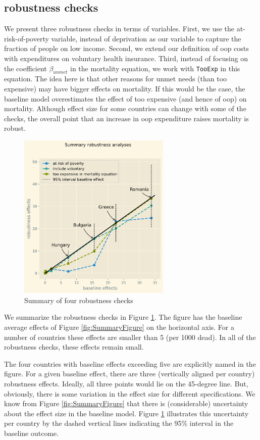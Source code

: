 \documentclass[a4paper,12pt]{article}
\begin{document}
\subsection{robustness checks}
\label{sec:orgbb2c578}

We present three robustness checks in terms of variables. First, we use the at-risk-of-poverty variable, instead of deprivation as our variable to capture the fraction of people on low income. Second, we extend our definition of oop costs with expenditures on voluntary health insurance. Third, instead of focusing on the coefficient \(\beta_{unmet}\) in the mortality equation, we work with \texttt{TooExp} in this equation. The idea here is that other reasons for unmet needs (than too expensive) may have bigger effects on mortality. If this would be the case, the baseline model overestimates the effect of too expensive (and hence of oop) on mortality. Although effect size for some countries can change with some of the checks, the overall point that an increase in oop expenditure raises mortality is robust.


\begin{figure}[htbp]
\centering
\includegraphics[height=8cm]{./figures/robustness_summary.png}
\caption{\label{fig:robustness_summary}Summary of four robustness checks}
\end{figure}

We summarize the robustness checks in Figure \ref{fig:robustness_summary}. The figure has the baseline average effects of Figure \ref{fig:SummaryFigure} on the horizontal axis. For a number of countries these effects are smaller than 5 (per 1000 dead). In all of the robustness checks, these effects remain small.

The four countries with baseline effects exceeding five are explicitly named in the figure. For a given baseline effect, there are three (vertically aligned per country) robustness effects. Ideally, all three points would lie on the 45-degree line. But, obviously, there is some variation in the effect size for different specifications. We know from Figure \ref{fig:SummaryFigure} that there is (considerable) uncertainty about the effect size in the baseline model. Figure \ref{fig:robustness_summary} illustrates this uncertainty per country by the dashed vertical lines indicating the 95\% interval in the baseline outcome.
\end{document}
